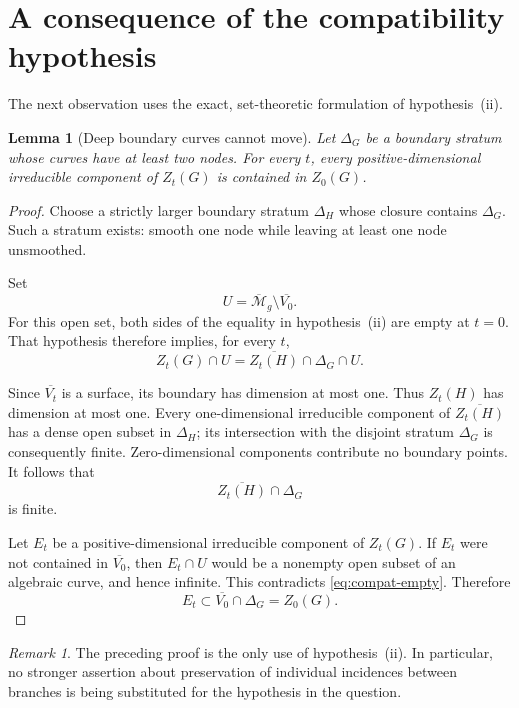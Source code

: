 \documentclass[11pt]{article}
\newcommand{\M}{\mathcal M}
\newcommand{\ol}[1]{\overline{#1}}
\newtheorem{lemma}[theorem]{Lemma}
\theoremstyle{remark}
\newtheorem{remark}[theorem]{Remark}
\begin{document}
\section{A consequence of the compatibility hypothesis}

The next observation uses the exact, set-theoretic formulation
of hypothesis~(ii).

\begin{lemma}[Deep boundary curves cannot move]\label{lem:deep}
Let \(\Delta_G\) be a boundary stratum whose curves have at least
two nodes. For every \(t\), every positive-dimensional
irreducible component of \(Z_t(G)\) is contained in \(Z_0(G)\).
\end{lemma}

\begin{proof}
Choose a strictly larger boundary stratum \(\Delta_H\) whose
closure contains \(\Delta_G\). Such a stratum exists: smooth
one node while leaving at least one node unsmoothed.

Set
\[
U=\ol{\M}_g\setminus\ol{V_0}.
\]
For this open set, both sides of the equality in
hypothesis~(ii) are empty at \(t=0\). That hypothesis therefore
implies, for every \(t\),
\begin{equation}\label{eq:compat-empty}
Z_t(G)\cap U
=
\ol{Z_t(H)}\cap\Delta_G\cap U.
\end{equation}

Since \(\ol{V_t}\) is a surface, its boundary has dimension at
most one. Thus \(Z_t(H)\) has dimension at most one. Every
one-dimensional irreducible component of \(\ol{Z_t(H)}\) has
a dense open subset in \(\Delta_H\); its intersection with the
disjoint stratum \(\Delta_G\) is consequently finite.
Zero-dimensional components contribute no boundary points.
It follows that
\[
\ol{Z_t(H)}\cap\Delta_G
\]
is finite.

Let \(E_t\) be a positive-dimensional irreducible component of
\(Z_t(G)\). If \(E_t\) were not contained in \(\ol{V_0}\), then
\(E_t\cap U\) would be a nonempty open subset of an algebraic
curve, and hence infinite. This contradicts
\eqref{eq:compat-empty}. Therefore
\[
E_t\subset\ol{V_0}\cap\Delta_G=Z_0(G).
\]
\end{proof}

\begin{remark}\label{rem:compatibility}
The preceding proof is the only use of hypothesis~(ii).
In particular, no stronger assertion about preservation of
individual incidences between branches is being substituted
for the hypothesis in the question.
\end{remark}
\end{document}
